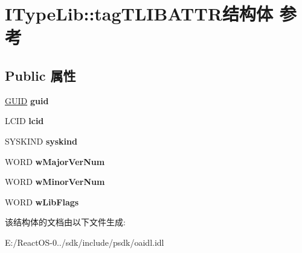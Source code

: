 \hypertarget{struct_i_type_lib_1_1tag_t_l_i_b_a_t_t_r}{}\section{I\+Type\+Lib\+:\+:tag\+T\+L\+I\+B\+A\+T\+T\+R结构体 参考}
\label{struct_i_type_lib_1_1tag_t_l_i_b_a_t_t_r}
\subsection*{Public 属性}
\begin{DoxyCompactItemize}
\item 
\mbox{\label{struct_i_type_lib_1_1tag_t_l_i_b_a_t_t_r_a0ac19cf8478a21c15b575556f7bd8d55}} 
\hyperlink{interface_g_u_i_d}{G\+U\+ID} {\bfseries guid}
\item 
\mbox{\label{struct_i_type_lib_1_1tag_t_l_i_b_a_t_t_r_a246277907d3e7a7486b803afe6bbec9f}} 
L\+C\+ID {\bfseries lcid}
\item 
\mbox{\label{struct_i_type_lib_1_1tag_t_l_i_b_a_t_t_r_acf123a1ea424984236b3b52e8a1bce5e}} 
S\+Y\+S\+K\+I\+ND {\bfseries syskind}
\item 
\mbox{\label{struct_i_type_lib_1_1tag_t_l_i_b_a_t_t_r_aa3ce816e2fe49ceb8b7fa30d8aae7f5e}} 
W\+O\+RD {\bfseries w\+Major\+Ver\+Num}
\item 
\mbox{\label{struct_i_type_lib_1_1tag_t_l_i_b_a_t_t_r_a4ef9ad8c763f2db21b5ce4c65efbbcb1}} 
W\+O\+RD {\bfseries w\+Minor\+Ver\+Num}
\item 
\mbox{\label{struct_i_type_lib_1_1tag_t_l_i_b_a_t_t_r_a8128689da6fc55b62a183a04c223db27}} 
W\+O\+RD {\bfseries w\+Lib\+Flags}
\end{DoxyCompactItemize}


该结构体的文档由以下文件生成\+:\begin{DoxyCompactItemize}
\item 
E\+:/\+React\+O\+S-\/0../sdk/include/psdk/oaidl.\+idl\end{DoxyCompactItemize}
